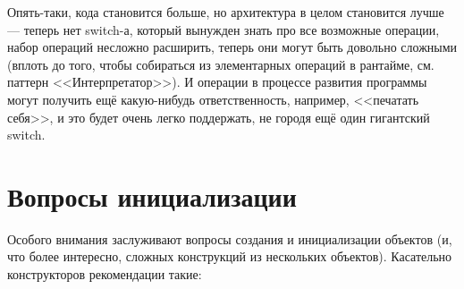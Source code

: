 \documentclass{../../text-style}
\begin{document}
Опять-таки, кода становится больше, но архитектура в целом становится лучше --- теперь нет switch-а, который вынужден знать про все возможные операции, набор операций несложно расширить, теперь они могут быть довольно сложными (вплоть до того, чтобы собираться из элементарных операций в рантайме, см. паттерн <<Интерпретатор>>). И операции в процессе развития программы могут получить ещё какую-нибудь ответственность, например, <<печатать себя>>, и это будет очень легко поддержать, не городя ещё один гигантский switch.

\section{Вопросы инициализации}

Особого внимания заслуживают вопросы создания и инициализации объектов (и, что более интересно, сложных конструкций из нескольких объектов). Касательно конструкторов рекомендации такие:
\end{document}
